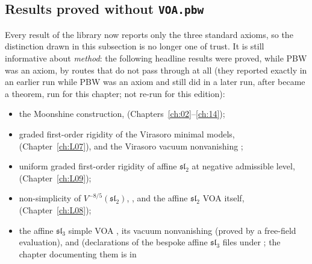 \subsection{Results proved without \texorpdfstring{\texttt{VOA.pbw}}{VOA.pbw}}

Every result of the library now reports only the three standard axioms, so the distinction drawn in
this subsection is no longer one of trust. It is still informative about \emph{method}: the following
headline results were proved, while PBW was an axiom, by routes that do not pass through  at
all (they reported exactly  in an earlier run while PBW was an axiom and still did
in a later run, after  became a theorem, run for this chapter; not re-run for this edition):
\begin{itemize}
\item the Moonshine construction, \allowbreak{}\allowbreak{} (Chapters~\ref{ch:02}--\ref{ch:14});
\item graded first-order rigidity of the Virasoro minimal models, \allowbreak{}\allowbreak{}\allowbreak{}\allowbreak{}
  (Chapter~\ref{ch:L07}), and the Virasoro vacuum nonvanishing \allowbreak{};
\item uniform graded first-order rigidity of affine $\mathfrak{sl}_2$ at negative admissible level,
  \allowbreak{}\allowbreak{}\allowbreak{}\allowbreak{}\allowbreak{}\allowbreak{} (Chapter~\ref{ch:L09});
\item non-simplicity of $V^{-8/5}(\mathfrak{sl}_2)$, \allowbreak{}\allowbreak{}\allowbreak{}\allowbreak{}, and the
  affine $\mathfrak{sl}_2$ VOA itself, \allowbreak{}\allowbreak{}\allowbreak{} (Chapter~\ref{ch:L08});
\item the affine $\mathfrak{sl}_3$ simple VOA \allowbreak{}\allowbreak{}, its vacuum nonvanishing
  \allowbreak{}\allowbreak{}\allowbreak{}\allowbreak{} (proved by a free-field evaluation), and
  \allowbreak{}\allowbreak{}\allowbreak{}\allowbreak{} (declarations of the
  bespoke affine $\mathfrak{sl}_3$ files under ; the chapter documenting them is in

\end{itemize}
